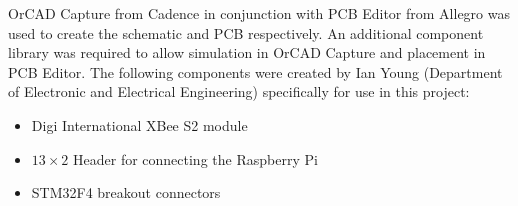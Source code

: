OrCAD Capture from Cadence in conjunction with PCB Editor from Allegro was used to create the schematic and PCB respectively.  An additional component library was required to allow simulation in OrCAD Capture and placement in PCB Editor. The following components were created by Ian Young (Department of Electronic and Electrical Engineering) specifically for use in this project:
	\begin{itemize}
		\item Digi International XBee S2 module
		\item $13\times2$ Header for connecting the Raspberry Pi
		\item STM32F4 breakout connectors
	\end{itemize}
